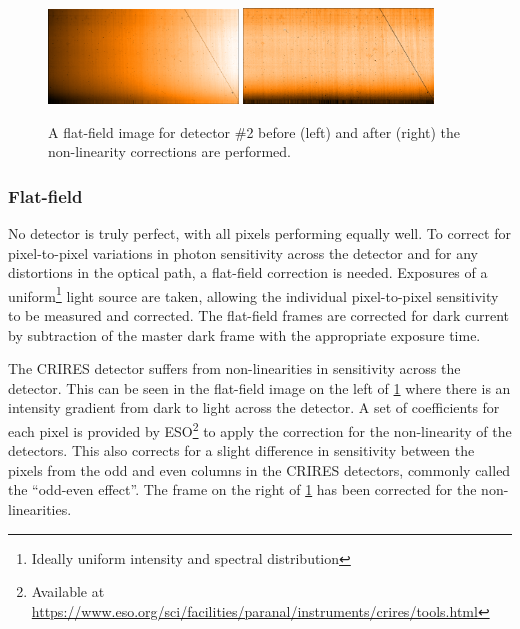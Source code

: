 \begin{figure}[h]
    \centering
        \includegraphics[width=0.45\textwidth]{figures/reduction/Flat_2.png} %
        \includegraphics[width=0.45\textwidth]{figures/reduction/FlatR_2.png} %
    \caption[Example of flat-field correction.]{A flat-field image for detector \#2 before (left) and after (right) the non-linearity corrections are performed.}
    \label{fig:masterflats_colour}
\end{figure}


\subsubsection{Flat-field}
\label{subsubsec:flat-field}
No detector is truly perfect, with all pixels performing equally well.
To correct for pixel-to-pixel variations in photon sensitivity across the detector and for any distortions in the optical path, a flat-field correction is needed.
Exposures of a uniform\footnote{Ideally uniform intensity and spectral distribution} light source are taken, allowing the individual pixel-to-pixel sensitivity to be measured and corrected.
The flat-field frames are corrected for dark current by subtraction of the master dark frame with the appropriate exposure time.

The {CRIRES} detector suffers from non-linearities in sensitivity across the detector.
This can be seen in the flat-field image on the left of \cref{fig:masterflats_colour} where there is an intensity gradient from dark to light across the detector.
A set of coefficients for each pixel is provided by {ESO}\footnote{Available at \href{https://www.eso.org/sci/facilities/paranal/instruments/crires/tools.html}{https://www.eso.org/sci/facilities/paranal/instruments/crires/tools.html}} to apply the correction for the non-linearity of the detectors.
This also corrects for a slight difference in sensitivity between the pixels from the odd and even columns in the {CRIRES} detectors, commonly called the ``odd-even effect''.
The frame on the right of \cref{fig:masterflats_colour} has been corrected for the non-linearities.

